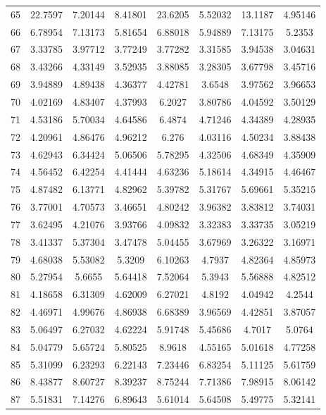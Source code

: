 \begin{center}
\begin{longtable}{cccccccc}
65 & 22.7597 & 7.20144 & 8.41801 & 23.6205 & 5.52032 & 13.1187 & 4.95146\\
66 & 6.78954 & 7.13173 & 5.81654 & 6.88018 & 5.94889 & 7.13175 & 5.2353\\
67 & 3.33785 & 3.97712 & 3.77249 & 3.77282 & 3.31585 & 3.94538 & 3.04631\\
68 & 3.43266 & 4.33149 & 3.52935 & 3.88085 & 3.28305 & 3.67798 & 3.45716\\
69 & 3.94889 & 4.89438 & 4.36377 & 4.42781 & 3.6548 & 3.97562 & 3.96653\\
70 & 4.02169 & 4.83407 & 4.37993 & 6.2027 & 3.80786 & 4.04592 & 3.50129\\
71 & 4.53186 & 5.70034 & 4.64586 & 6.4874 & 4.71246 & 4.34389 & 4.28935\\
72 & 4.20961 & 4.86476 & 4.96212 & 6.276 & 4.03116 & 4.50234 & 3.88438\\
73 & 4.62943 & 6.34424 & 5.06506 & 5.78295 & 4.32506 & 4.68349 & 4.35909\\
74 & 4.56452 & 6.42254 & 4.41444 & 4.63236 & 5.18614 & 4.34915 & 4.46467\\
75 & 4.87482 & 6.13771 & 4.82962 & 5.39782 & 5.31767 & 5.69661 & 5.35215\\
76 & 3.77001 & 4.70573 & 3.46651 & 4.80242 & 3.96382 & 3.83812 & 3.74031\\
77 & 3.62495 & 4.21076 & 3.93766 & 4.09832 & 3.32383 & 3.33735 & 3.05219\\
78 & 3.41337 & 5.37304 & 3.47478 & 5.04455 & 3.67969 & 3.26322 & 3.16971\\
79 & 4.68038 & 5.53082 & 5.3209 & 6.10263 & 4.7937 & 4.82364 & 4.85973\\
80 & 5.27954 & 5.6655 & 5.64418 & 7.52064 & 5.3943 & 5.56888 & 4.82512\\
81 & 4.18658 & 6.31309 & 4.62009 & 6.27021 & 4.8192 & 4.04942 & 4.2544\\
82 & 4.46971 & 4.99676 & 4.86938 & 6.68389 & 3.96569 & 4.42851 & 3.87057\\
83 & 5.06497 & 6.27032 & 4.62224 & 5.91748 & 5.45686 & 4.7017 & 5.0764\\
84 & 5.04779 & 5.65724 & 5.80525 & 8.9618 & 4.55165 & 5.01618 & 4.77258\\
85 & 5.31099 & 6.23293 & 6.22143 & 7.23446 & 6.83254 & 5.11125 & 5.61759\\
86 & 8.43877 & 8.60727 & 8.39237 & 8.75244 & 7.71386 & 7.98915 & 8.06142\\
87 & 5.51831 & 7.14276 & 6.89643 & 5.61014 & 5.64508 & 5.49775 & 5.32141\\

\end{longtable}
\end{center}
